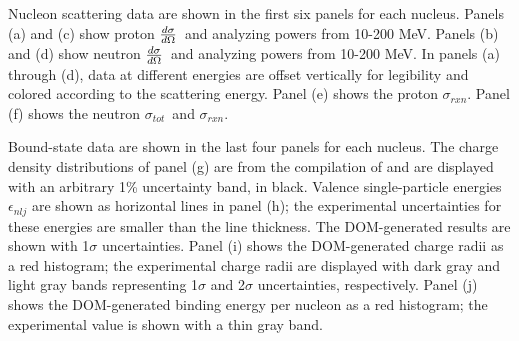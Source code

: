 \documentclass[twocolumn,secnumarabic,amssymb, nobibnotes, aps, prl,
superscriptaddress, nobalancelastpage]{revtex4}
\newcommand{\tot}{\ensuremath{\sigma_{tot}}}
\newcommand{\rxn}{\ensuremath{\sigma_{rxn}}}
\newcommand{\el}{\ensuremath{\frac{\lowercase{d}\sigma}{\lowercase{d}\Omega}}}
\begin{document}
Nucleon scattering data are shown in the first six panels for each nucleus.
Panels (a) and (c) show proton \el\ and analyzing powers from 10-200 MeV.
Panels (b) and (d) show neutron \el\ and analyzing powers from 10-200 MeV.
In panels (a) through (d), data at different energies are offset
vertically for legibility and colored according to the scattering
energy. Panel (e) shows the proton \rxn. Panel (f) shows the
neutron \tot\ and \rxn.

Bound-state data are shown in the last four panels for each nucleus.
The charge density distributions of panel (g) are from the compilation of
\cite{DeVries1987} and are displayed with an arbitrary 1\% uncertainty
band, in black. Valence single-particle energies $\epsilon_{nlj}$ are shown as
horizontal lines in panel (h); the experimental uncertainties for these energies
are smaller than the line thickness. The DOM-generated results are shown with
1$\sigma$ uncertainties. Panel (i) shows the DOM-generated charge radii as a red
histogram; the experimental charge radii are displayed with dark gray and light
gray bands representing 1$\sigma$ and 2$\sigma$ uncertainties, respectively.
Panel (j) shows the DOM-generated binding energy per nucleon as a red
histogram; the experimental value is shown with a thin gray band.
\end{document}
